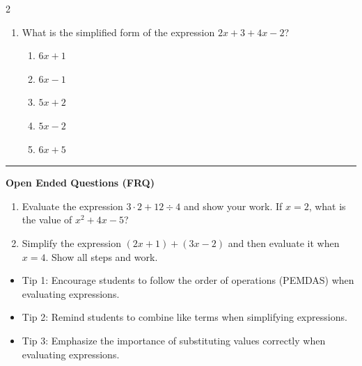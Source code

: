 \documentclass[10pt]{article}
\begin{document}
\begin{multicols}{2}
\begin{enumerate}[label=\textbf{Q\arabic*.}, leftmargin=*, itemsep=6pt, parsep=0pt]
  \item \small What is the simplified form of the expression $2x + 3 + 4x - 2$?
  \begin{enumerate}[label=(\Alph*), leftmargin=0.6cm, nosep, itemsep=2pt]
    \item $6x + 1$
    \item $6x - 1$
    \item $5x + 2$
    \item $5x - 2$
    \item $6x + 5$
  \end{enumerate}

\end{enumerate}
\end{multicols}

\vspace{-0.2cm}
\hrule
\vspace{0.2cm}
\textbf{\small Open Ended Questions (FRQ)}
\begin{enumerate}[label=\textbf{Q\arabic*.}, start=9, itemsep=5pt, topsep=0pt]

  \item \small Evaluate the expression $3 \cdot 2 + 12 \div 4$ and show your work. If $x = 2$, what is the value of $x^2 + 4x - 5$? \vspace{2cm}

  \item \small Simplify the expression $(2x + 1) + (3x - 2)$ and then evaluate it when $x = 4$. Show all steps and work. \vspace{2cm}

\end{enumerate}

\vfill

\begin{tcolorbox}[colback=blue!5, colframe=mainblue!50, title=\small \textbf{Chef's Tips}, fonttitle=\bfseries, bottom=1mm]
\begin{itemize}[noitemsep, topsep=2pt, leftmargin=0.5cm]
  \item \scriptsize Tip 1: Encourage students to follow the order of operations (PEMDAS) when evaluating expressions.\item \scriptsize Tip 2: Remind students to combine like terms when simplifying expressions.\item \scriptsize Tip 3: Emphasize the importance of substituting values correctly when evaluating expressions.
\end{itemize}
\end{tcolorbox}
\end{document}
